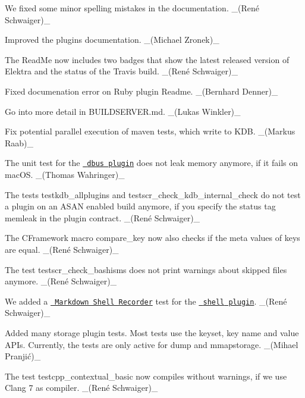 \begin{DoxyItemize}
\item We fixed some minor spelling mistakes in the documentation. \+\_\+(René Schwaiger)\+\_\+
\item Improved the plugins documentation. \+\_\+(\+Michael Zronek)\+\_\+
\item The Read\+Me now includes two badges that show the latest released version of Elektra and the status of the Travis build. \+\_\+(René Schwaiger)\+\_\+
\item Fixed documenation error on Ruby plugin Readme. \+\_\+(\+Bernhard Denner)\+\_\+
\item Go into more detail in B\+U\+I\+L\+D\+S\+E\+R\+V\+ER.md. \+\_\+(\+Lukas Winkler)\+\_\+
\end{DoxyItemize}


\begin{DoxyItemize}
\item Fix potential parallel execution of maven tests, which write to K\+DB. \+\_\+(\+Markus Raab)\+\_\+
\item The unit test for the \href{https://www.libelektra.org/plugins/dbus}{\texttt{ {\ttfamily dbus} plugin}} does not leak memory anymore, if it fails on mac\+OS. \+\_\+(\+Thomas Wahringer)\+\_\+
\item The tests {\ttfamily testkdb\+\_\+allplugins} and {\ttfamily testscr\+\_\+check\+\_\+kdb\+\_\+internal\+\_\+check} do not test a plugin on an A\+S\+AN enabled build anymore, if you specify the status tag {\ttfamily memleak} in the plugin contract. \+\_\+(René Schwaiger)\+\_\+
\item The C\+Framework macro {\ttfamily compare\+\_\+key} now also checks if the meta values of keys are equal. \+\_\+(René Schwaiger)\+\_\+
\item The test {\ttfamily testscr\+\_\+check\+\_\+bashisms} does not print warnings about skipped files anymore. \+\_\+(René Schwaiger)\+\_\+
\item We added a \href{https://master.libelektra.org/tests/shell/shell_recorder/tutorial_wrapper}{\texttt{ Markdown Shell Recorder}} test for the \href{https://www.libelektra.org/plugins/shell}{\texttt{ {\ttfamily shell} plugin}}. \+\_\+(René Schwaiger)\+\_\+
\item Added many storage plugin tests. Most tests use the keyset, key name and value A\+P\+Is. Currently, the tests are only active for {\ttfamily dump} and {\ttfamily mmapstorage}. \+\_\+(Mihael Pranjić)\+\_\+
\item The test {\ttfamily testcpp\+\_\+contextual\+\_\+basic} now compiles without warnings, if we use Clang 7 as compiler. \+\_\+(René Schwaiger)\+\_\+

\end{DoxyItemize}
